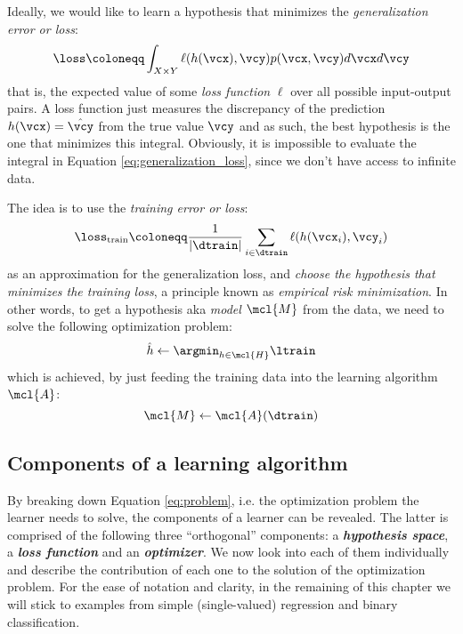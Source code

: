 Ideally, we would like to learn a hypothesis that minimizes the
\emph{generalization error or loss}:
\begin{equation}
	\label{eq:generalization_loss}
	\loss \coloneqq \int_{X \times Y} \ell(h(\vcx), \vcy) p(\vcx, \vcy) d\vcx d\vcy
\end{equation}
that is, the expected value of some \emph{loss function}
$\ell$ over all possible input-output pairs. A loss function just measures the
discrepancy of the prediction $h(\vcx) = \hat{\vcy}$ from the true value $\vcy$
and as such, the best hypothesis is the one that minimizes this integral.
Obviously, it is impossible to evaluate the integral in Equation
\ref{eq:generalization_loss}, since we don't have access to infinite data.

The idea is to use the \emph{training error or loss}:
\begin{equation}
	\label{eq:training_loss}
	\loss_\text{train} \coloneqq \frac{1}{\lvert \dtrain \rvert} \sum_{i \in \dtrain}
	\ell(h(\vcx_i), \vcy_i)
\end{equation}
as an approximation for the generalization loss, and \emph{choose the hypothesis
that minimizes the training loss}, a principle known as \emph{empirical risk
minimization}. In other words, to get a
hypothesis aka \emph{model} $\mcl{M}$ from the data, we need to
solve the following optimization problem:
\begin{equation}
	\label{eq:problem}
	\hat{h} \gets \argmin_{h \in \mcl{H}} \ltrain
\end{equation}
which is achieved, by just feeding the training data into the learning
algorithm $\mcl{A}$:
\begin{equation}
	\label{eq:learner}
	\mcl{M} \gets \mcl{A}(\dtrain)
\end{equation}

\subsection{Components of a learning algorithm}

By breaking down Equation \ref{eq:problem}, i.e. the optimization problem the
learner needs to solve, the components of a learner can be revealed. The latter
is comprised of the following three ``orthogonal'' components: a
\emph{\textbf{hypothesis space}}, a \emph{\textbf{loss
function}} and an \emph{\textbf{optimizer}}. We now look into each of them
individually and describe the contribution of each one to the solution of the
optimization problem. For the ease of notation and clarity, in the remaining of
this chapter we will stick to examples from simple (single-valued) regression
and binary classification.

